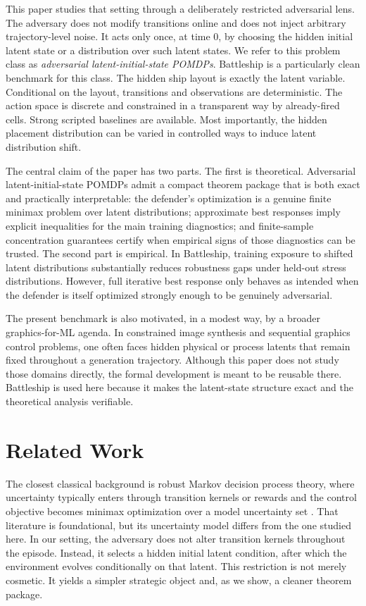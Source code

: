 \documentclass[11pt]{article}
\begin{document}
This paper studies that setting through a deliberately restricted adversarial lens. The adversary does not modify transitions online and does not inject arbitrary trajectory-level noise. It acts only once, at time $0$, by choosing the hidden initial latent state or a distribution over such latent states. We refer to this problem class as \emph{adversarial latent-initial-state POMDPs}. Battleship is a particularly clean benchmark for this class. The hidden ship layout is exactly the latent variable. Conditional on the layout, transitions and observations are deterministic. The action space is discrete and constrained in a transparent way by already-fired cells. Strong scripted baselines are available. Most importantly, the hidden placement distribution can be varied in controlled ways to induce latent distribution shift.

The central claim of the paper has two parts. The first is theoretical. Adversarial latent-initial-state POMDPs admit a compact theorem package that is both exact and practically interpretable: the defender's optimization is a genuine finite minimax problem over latent distributions; approximate best responses imply explicit inequalities for the main training diagnostics; and finite-sample concentration guarantees certify when empirical signs of those diagnostics can be trusted. The second part is empirical. In Battleship, training exposure to shifted latent distributions substantially reduces robustness gaps under held-out stress distributions. However, full iterative best response only behaves as intended when the defender is itself optimized strongly enough to be genuinely adversarial.

The present benchmark is also motivated, in a modest way, by a broader graphics-for-ML agenda. In constrained image synthesis and sequential graphics control problems, one often faces hidden physical or process latents that remain fixed throughout a generation trajectory. Although this paper does not study those domains directly, the formal development is meant to be reusable there. Battleship is used here because it makes the latent-state structure exact and the theoretical analysis verifiable.

\section{Related Work}

The closest classical background is robust Markov decision process theory, where uncertainty typically enters through transition kernels or rewards and the control objective becomes minimax optimization over a model uncertainty set \citep{iyengar2005robust,nilim2005robust}. That literature is foundational, but its uncertainty model differs from the one studied here. In our setting, the adversary does not alter transition kernels throughout the episode. Instead, it selects a hidden initial latent condition, after which the environment evolves conditionally on that latent. This restriction is not merely cosmetic. It yields a simpler strategic object and, as we show, a cleaner theorem package.
\end{document}
